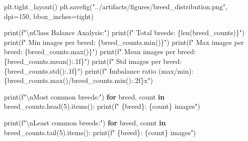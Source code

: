 \documentclass[
  letterpaper,
  DIV=11,
  numbers=noendperiod]{scrartcl}
\newenvironment{Shaded}{\begin{snugshade}}{\end{snugshade}}
\newcommand{\BuiltInTok}[1]{\textcolor[rgb]{0.00,0.23,0.31}{#1}}
\newcommand{\CharTok}[1]{\textcolor[rgb]{0.13,0.47,0.30}{#1}}
\newcommand{\ControlFlowTok}[1]{\textcolor[rgb]{0.00,0.23,0.31}{\textbf{#1}}}
\newcommand{\DecValTok}[1]{\textcolor[rgb]{0.68,0.00,0.00}{#1}}
\newcommand{\KeywordTok}[1]{\textcolor[rgb]{0.00,0.23,0.31}{\textbf{#1}}}
\newcommand{\NormalTok}[1]{\textcolor[rgb]{0.00,0.23,0.31}{#1}}
\newcommand{\OperatorTok}[1]{\textcolor[rgb]{0.37,0.37,0.37}{#1}}
\newcommand{\SpecialCharTok}[1]{\textcolor[rgb]{0.37,0.37,0.37}{#1}}
\newcommand{\SpecialStringTok}[1]{\textcolor[rgb]{0.13,0.47,0.30}{#1}}
\newcommand{\StringTok}[1]{\textcolor[rgb]{0.13,0.47,0.30}{#1}}
\renewenvironment{Shaded}{%
  \begin{tcolorbox}[%
    enhanced,%
    colback=codebg,%
    colframe=codebg,%
    borderline west={3pt}{0pt}{sectionblue},%
    boxrule=0pt,%
    arc=0pt,%
    boxsep=5pt,%
    left=2mm,%
    right=2mm,%
    top=2mm,%
    bottom=2mm%
  ]%
}{%
  \end{tcolorbox}%
}
\begin{document}
\begin{Shaded}
\begin{Highlighting}[]
\NormalTok{plt.tight\_layout()}
\NormalTok{plt.savefig(}\StringTok{"../artifacts/figures/breed\_distribution.png"}\NormalTok{, dpi}\OperatorTok{=}\DecValTok{150}\NormalTok{, bbox\_inches}\OperatorTok{=}\StringTok{\textquotesingle{}tight\textquotesingle{}}\NormalTok{)}

\BuiltInTok{print}\NormalTok{(}\SpecialStringTok{f"}\CharTok{\textbackslash{}n}\SpecialStringTok{Class Balance Analysis:"}\NormalTok{)}
\BuiltInTok{print}\NormalTok{(}\SpecialStringTok{f"  Total breeds: }\SpecialCharTok{\{}\BuiltInTok{len}\NormalTok{(breed\_counts)}\SpecialCharTok{\}}\SpecialStringTok{"}\NormalTok{)}
\BuiltInTok{print}\NormalTok{(}\SpecialStringTok{f"  Min images per breed: }\SpecialCharTok{\{}\NormalTok{breed\_counts}\SpecialCharTok{.}\BuiltInTok{min}\NormalTok{()}\SpecialCharTok{\}}\SpecialStringTok{"}\NormalTok{)}
\BuiltInTok{print}\NormalTok{(}\SpecialStringTok{f"  Max images per breed: }\SpecialCharTok{\{}\NormalTok{breed\_counts}\SpecialCharTok{.}\BuiltInTok{max}\NormalTok{()}\SpecialCharTok{\}}\SpecialStringTok{"}\NormalTok{)}
\BuiltInTok{print}\NormalTok{(}\SpecialStringTok{f"  Mean images per breed: }\SpecialCharTok{\{}\NormalTok{breed\_counts}\SpecialCharTok{.}\NormalTok{mean()}\SpecialCharTok{:.1f\}}\SpecialStringTok{"}\NormalTok{)}
\BuiltInTok{print}\NormalTok{(}\SpecialStringTok{f"  Std images per breed: }\SpecialCharTok{\{}\NormalTok{breed\_counts}\SpecialCharTok{.}\NormalTok{std()}\SpecialCharTok{:.1f\}}\SpecialStringTok{"}\NormalTok{)}
\BuiltInTok{print}\NormalTok{(}\SpecialStringTok{f"  Imbalance ratio (max/min): }\SpecialCharTok{\{}\NormalTok{breed\_counts}\SpecialCharTok{.}\BuiltInTok{max}\NormalTok{()}\OperatorTok{/}\NormalTok{breed\_counts}\SpecialCharTok{.}\BuiltInTok{min}\NormalTok{()}\SpecialCharTok{:.2f\}}\SpecialStringTok{x"}\NormalTok{)}

\BuiltInTok{print}\NormalTok{(}\SpecialStringTok{f"}\CharTok{\textbackslash{}n}\SpecialStringTok{Most common breeds:"}\NormalTok{)}
\ControlFlowTok{for}\NormalTok{ breed, count }\KeywordTok{in}\NormalTok{ breed\_counts.head(}\DecValTok{5}\NormalTok{).items():}
    \BuiltInTok{print}\NormalTok{(}\SpecialStringTok{f"  }\SpecialCharTok{\{}\NormalTok{breed}\SpecialCharTok{\}}\SpecialStringTok{: }\SpecialCharTok{\{}\NormalTok{count}\SpecialCharTok{\}}\SpecialStringTok{ images"}\NormalTok{)}
    
\BuiltInTok{print}\NormalTok{(}\SpecialStringTok{f"}\CharTok{\textbackslash{}n}\SpecialStringTok{Least common breeds:"}\NormalTok{)}
\ControlFlowTok{for}\NormalTok{ breed, count }\KeywordTok{in}\NormalTok{ breed\_counts.tail(}\DecValTok{5}\NormalTok{).items():}
    \BuiltInTok{print}\NormalTok{(}\SpecialStringTok{f"  }\SpecialCharTok{\{}\NormalTok{breed}\SpecialCharTok{\}}\SpecialStringTok{: }\SpecialCharTok{\{}\NormalTok{count}\SpecialCharTok{\}}\SpecialStringTok{ images"}\NormalTok{)}
\end{Highlighting}
\end{Shaded}
\end{document}
